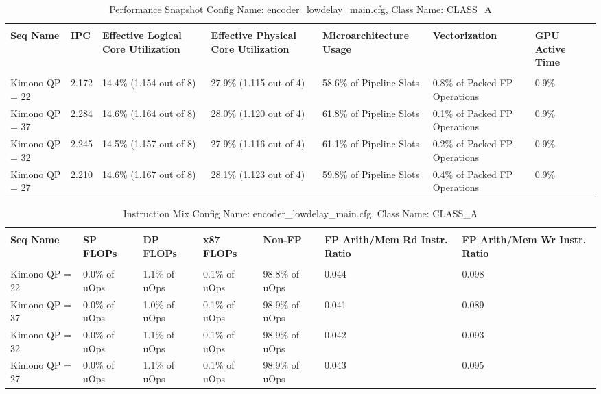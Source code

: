 \documentclass{article}%
\begin{document}
\begin{longtabu}{| X[l] | X[l] | X[l] | X[l] | X[l] | X[l] | X[l] |}%
\caption{%
Performance Snapshot\newline%
 Config Name: encoder\_lowdelay\_main.cfg,\newline%
 Class Name: CLASS\_A\newline%
%
}%
\hline%
&&&&&&\\%
\textbf{Seq Name}&\textbf{IPC}&\textbf{Effective Logical Core Utilization}&\textbf{Effective Physical Core Utilization}&\textbf{Microarchitecture Usage}&\textbf{Vectorization}&\textbf{GPU Active Time}\\%
&&&&&&\\%
\hline%
\endhead%
Kimono\newline%
 QP = 22&2.172&14.4\% (1.154 out of 8)&27.9\% (1.115 out of 4)&58.6\% of Pipeline Slots&0.8\% of Packed FP Operations&0.9\%\\%
\hline%
Kimono\newline%
 QP = 37&2.284&14.6\% (1.164 out of 8)&28.0\% (1.120 out of 4)&61.8\% of Pipeline Slots&0.1\% of Packed FP Operations&0.9\%\\%
\hline%
Kimono\newline%
 QP = 32&2.245&14.5\% (1.157 out of 8)&27.9\% (1.116 out of 4)&61.1\% of Pipeline Slots&0.2\% of Packed FP Operations&0.9\%\\%
\hline%
Kimono\newline%
 QP = 27&2.210&14.6\% (1.167 out of 8)&28.1\% (1.123 out of 4)&59.8\% of Pipeline Slots&0.4\% of Packed FP Operations&0.9\%\\%
\hline%
\end{longtabu}%
\begin{longtabu}{| X[l] | X[l] | X[l] | X[l] | X[l] | X[l] | X[l] |}%
\caption{%
Instruction Mix\newline%
 Config Name: encoder\_lowdelay\_main.cfg,\newline%
 Class Name: CLASS\_A\newline%
%
}%
\hline%
&&&&&&\\%
\textbf{Seq Name}&\textbf{SP FLOPs}&\textbf{DP FLOPs}&\textbf{x87 FLOPs}&\textbf{Non{-}FP}&\textbf{FP Arith/Mem Rd Instr. Ratio}&\textbf{FP Arith/Mem Wr Instr. Ratio}\\%
&&&&&&\\%
\hline%
\endhead%
Kimono\newline%
 QP = 22&0.0\% of uOps&1.1\% of uOps&0.1\% of uOps&98.8\% of uOps&0.044&0.098\\%
\hline%
Kimono\newline%
 QP = 37&0.0\% of uOps&1.0\% of uOps&0.1\% of uOps&98.9\% of uOps&0.041&0.089\\%
\hline%
Kimono\newline%
 QP = 32&0.0\% of uOps&1.1\% of uOps&0.1\% of uOps&98.9\% of uOps&0.042&0.093\\%
\hline%
Kimono\newline%
 QP = 27&0.0\% of uOps&1.1\% of uOps&0.1\% of uOps&98.9\% of uOps&0.043&0.095\\%
\hline%
\end{longtabu}%
\end{document}

